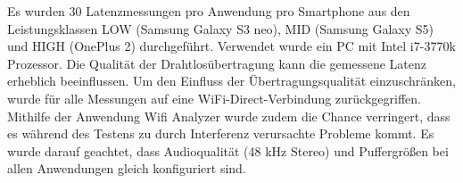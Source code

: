 Es wurden 30 Latenzmessungen pro Anwendung pro Smartphone aus den Leistungsklassen LOW (Samsung Galaxy S3 neo), MID (Samsung Galaxy S5) und HIGH (OnePlus 2) durchgeführt. Verwendet wurde ein PC mit Intel i7-3770k Prozessor. Die Qualität der Drahtlosübertragung kann die gemessene Latenz erheblich beeinflussen. Um den Einfluss der Übertragungsqualität einzuschränken, wurde für alle Messungen auf eine WiFi-Direct-Verbindung zurückgegriffen. Mithilfe der Anwendung Wifi Analyzer wurde zudem die Chance verringert, dass es während des Testens zu durch Interferenz verursachte Probleme kommt. Es wurde darauf geachtet, dass Audioqualität (48 kHz Stereo) und Puffergrößen bei allen Anwendungen gleich konfiguriert sind.